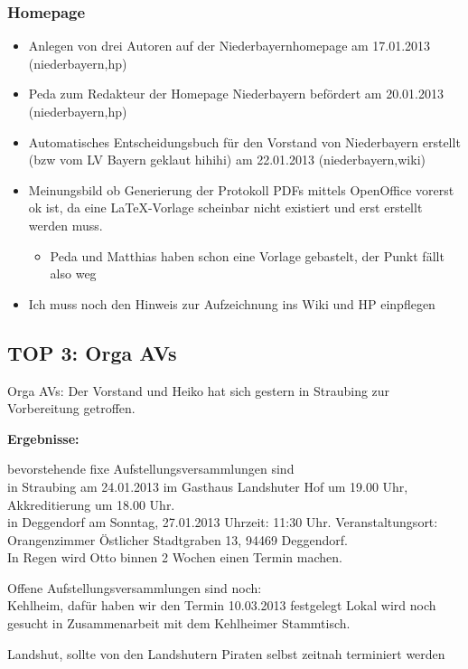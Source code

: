\documentclass{protokoll}
\begin{document}
\subsubsection{Homepage}
\begin{itemize}
\item Anlegen von drei Autoren auf der Niederbayernhomepage am 17.01.2013 (niederbayern,hp)
\item Peda zum Redakteur der Homepage Niederbayern befördert am 20.01.2013 (niederbayern,hp)
\item Automatisches Entscheidungsbuch für den Vorstand von Niederbayern erstellt (bzw vom LV Bayern geklaut hihihi) am 22.01.2013 (niederbayern,wiki)
\item Meinungsbild ob Generierung der Protokoll PDFs mittels OpenOffice vorerst ok ist, da eine \LaTeX-Vorlage scheinbar nicht existiert und erst erstellt werden muss.
  \begin{itemize}
  \item Peda und Matthias haben schon eine Vorlage gebastelt, der Punkt fällt also weg
  \end{itemize}
  \item Ich muss noch den Hinweis zur Aufzeichnung ins Wiki und HP einpflegen
\end{itemize}


\subsection{TOP 3: Orga AVs}
Orga AVs: Der Vorstand und Heiko hat sich gestern in Straubing zur Vorbereitung
getroffen.  

\textbf{Ergebnisse:}

bevorstehende fixe Aufstellungsversammlungen sind \\
in Straubing am 24.01.2013 im Gasthaus Landshuter Hof um 19.00 Uhr, Akkreditierung um 18.00 Uhr.\\
in Deggendorf am Sonntag, 27.01.2013 Uhrzeit: 11:30 Uhr. 
Veranstaltungsort: Orangenzimmer Östlicher Stadtgraben 13, 94469 Deggendorf.\\
In Regen wird Otto binnen 2 Wochen einen Termin machen.

Offene Aufstellungsversammlungen sind noch:\\
Kehlheim, dafür haben wir den Termin 10.03.2013 festgelegt Lokal wird noch gesucht in Zusammenarbeit mit dem Kehlheimer Stammtisch.

Landshut, sollte von den Landshutern Piraten selbst zeitnah terminiert werden
\end{document}
